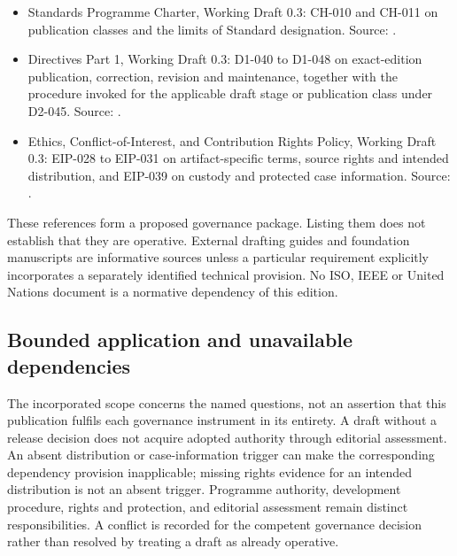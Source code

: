\documentclass[11pt,a4paper]{article}
\begin{document}
\begin{itemize}
\item Standards Programme Charter, Working Draft 0.3: CH-010 and CH-011 on publication classes and the limits of Standard designation. Source: .
\item Directives Part 1, Working Draft 0.3: D1-040 to D1-048 on exact-edition publication, correction, revision and maintenance, together with the procedure invoked for the applicable draft stage or publication class under D2-045. Source: .
\item Ethics, Conflict-of-Interest, and Contribution Rights Policy, Working Draft 0.3: EIP-028 to EIP-031 on artifact-specific terms, source rights and intended distribution, and EIP-039 on custody and protected case information. Source: .
\end{itemize}
These references form a proposed governance package. Listing them does not establish that they are operative. External drafting guides and foundation manuscripts are informative sources unless a particular requirement explicitly incorporates a separately identified technical provision. No ISO, IEEE or United Nations document is a normative dependency of this edition.

\subsection{Bounded application and unavailable dependencies}

The incorporated scope concerns the named questions, not an assertion that this publication fulfils each governance instrument in its entirety. A draft without a release decision does not acquire adopted authority through editorial assessment. An absent distribution or case-information trigger can make the corresponding dependency provision inapplicable; missing rights evidence for an intended distribution is not an absent trigger. Programme authority, development procedure, rights and protection, and editorial assessment remain distinct responsibilities. A conflict is recorded for the competent governance decision rather than resolved by treating a draft as already operative.
\end{document}
